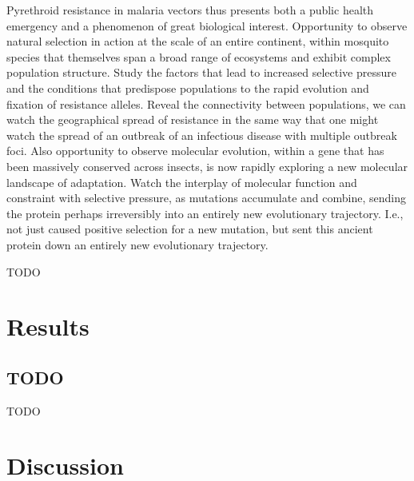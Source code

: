 \documentclass[a4paper,11pt,abstracton,hidelinks]{scrartcl}
\begin{document}
%
Pyrethroid resistance in malaria vectors thus presents both a public health emergency and a phenomenon of great biological interest.
%
Opportunity to observe natural selection in action at the scale of an entire continent, within mosquito species that themselves span a broad range of ecosystems and exhibit complex population structure.
%
Study the factors that lead to increased selective pressure and the conditions that predispose populations to the rapid evolution and fixation of resistance alleles.
%
Reveal the connectivity between populations, we can watch the geographical spread of resistance in the same way that one might watch the spread of an outbreak of an infectious disease with multiple outbreak foci.
%
Also opportunity to observe molecular evolution, within a gene that has been massively conserved across insects, is now rapidly exploring a new molecular landscape of adaptation.
%
Watch the interplay of molecular function and constraint with selective pressure, as mutations accumulate and combine, sending the protein perhaps irreversibly into an entirely new evolutionary trajectory.
%
I.e., not just caused positive selection for a new mutation, but sent this ancient protein down an entirely new evolutionary trajectory.




TODO




\section*{Results}


\subsection*{TODO}


TODO


\section*{Discussion}
\end{document}

